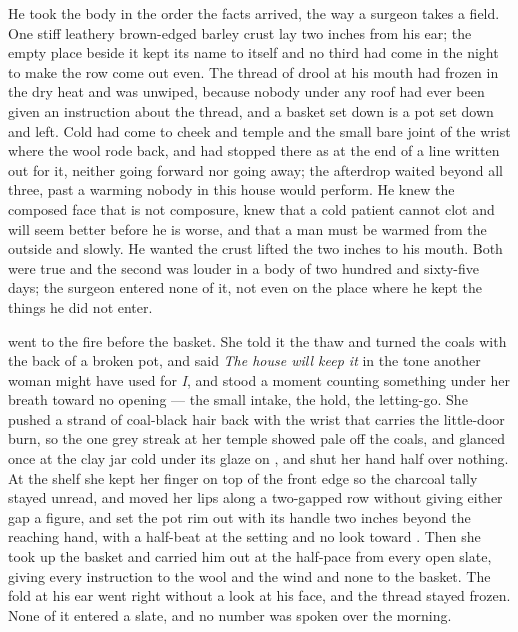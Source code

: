 He took the body in the order the facts arrived, the way a surgeon takes a field. One stiff leathery brown-edged barley crust lay two inches from his ear; the empty place beside it kept its name to itself and no third had come in the night to make the row come out even. The thread of drool at his mouth had frozen in the dry heat and was unwiped, because nobody under any roof had ever been given an instruction about the thread, and a basket set down is a pot set down and left. Cold had come to cheek and temple and the small bare joint of the wrist where the wool rode back, and had stopped there as at the end of a line written out for it, neither going forward nor going away; the afterdrop waited beyond all three, past a warming nobody in this house would perform. He knew the composed face that is not composure, knew that a cold patient cannot clot and will seem better before he is worse, and that a man must be warmed from the outside and slowly. He wanted the crust lifted the two inches to his mouth. Both were true and the second was louder in a body of two hundred and sixty-five days; the surgeon entered none of it, not even on the place where he kept the things he did not enter.

 went to the fire before the basket. She told it the thaw and turned the coals with the back of a broken pot, and said \emph{The house will keep it} in the tone another woman might have used for \emph{I}, and stood a moment counting something under her breath toward no opening --- the small intake, the hold, the letting-go. She pushed a strand of coal-black hair back with the wrist that carries the little-door burn, so the one grey streak at her temple showed pale off the coals, and glanced once at the clay jar cold under its glaze on , and shut her hand half over nothing. At the shelf she kept her finger on top of the front edge so the charcoal tally stayed unread, and moved her lips along a two-gapped row without giving either gap a figure, and set the pot rim out with its handle two inches beyond the reaching hand, with a half-beat at the setting and no look toward . Then she took up the basket and carried him out at the half-pace from every open slate, giving every instruction to the wool and the wind and none to the basket. The fold at his ear went right without a look at his face, and the thread stayed frozen. None of it entered a slate, and no number was spoken over the morning.

\scenebreak

